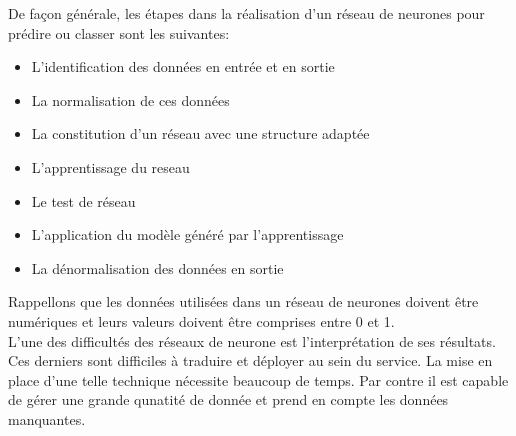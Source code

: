 \documentclass[11pt,a4paper]{report}
\begin{document}
De façon générale, les étapes dans la réalisation d'un réseau de neurones pour prédire ou classer sont les suivantes: 
\begin{itemize}
\item L'identification des données en entrée et en sortie
\item La normalisation de ces données 
\item La constitution d'un réseau avec une structure adaptée
\item L'apprentissage du reseau 
\item Le test de réseau 
\item L'application du modèle généré par l'apprentissage
\item La dénormalisation des données en sortie 
\end{itemize}

Rappellons que les données utilisées dans un réseau de neurones doivent être numériques et leurs valeurs doivent être comprises entre 0 et 1. \\

L'une des difficultés des réseaux de neurone est l'interprétation de ses résultats. Ces derniers sont difficiles à traduire et déployer au sein du service. La mise en place d'une telle technique nécessite beaucoup de temps. Par contre il est capable de gérer une grande qunatité de donnée et prend en compte les données manquantes. 

\newpage
\end{document}
